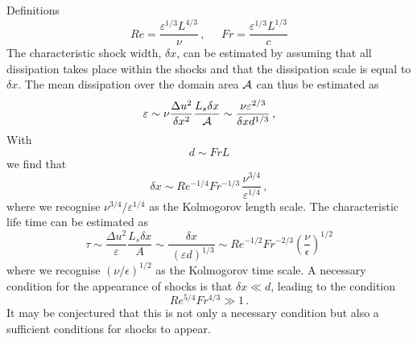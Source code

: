 \documentclass[12pt]{article}
\begin{document}
\vskip 5mm
\noindent Definitions
\begin{equation}
Re = \frac{\varepsilon^{1/3} L^{4/3}}{\nu} \, ,\;\;\;\;\; Fr = \frac{\varepsilon^{1/3} L^{1/3}}{c} 
\end{equation} 
The characteristic shock width, $ \delta x $, can be estimated by assuming that all dissipation takes place within the shocks and that the dissipation scale is equal to $ \delta x $. The mean dissipation over the domain area $ \cal{A} $
can thus be estimated as
\begin{equation}
\varepsilon \sim \nu  \frac{\Delta u^2} {\delta x^2} \frac{L_s \delta x} {\cal{A}}\sim \frac{\nu \varepsilon^{2/3} }{\delta x d^{1/3}} \, ,
\end{equation} 
With 
\begin{equation} \label{dScale}
d \sim Fr L   
\end{equation} 
we find that
\begin{equation}
\delta x \sim Re^{-1/4} Fr^{-1/3} \, \frac{\nu^{3/4}}{\varepsilon^{1/4}} \, ,
\end{equation}
where we recognise $ {\nu^{3/4}}/{\varepsilon^{1/4}} $ as the Kolmogorov length scale. The characteristic life time can be estimated as
\begin{equation}
\tau \sim  \frac{\Delta u^2}{\varepsilon} \frac{L_s \delta x}{A} \sim \frac{\delta x}{\; (\varepsilon d)^{1/3}} \sim Re^{-1/2} Fr^{-2/3} \left ( \frac {\nu}{\epsilon} \right )^{1/2} 
\end{equation} 
where we recognise  $ (  {\nu}/{\epsilon}  )^{1/2} $ as the Kolmogorov time scale. A necessary condition for the appearance of shocks is that $ \delta x \ll d $, leading to the condition
\begin{equation}
Re^{5/4} Fr^{4/3} \gg 1 \, .
\end{equation} 
It may be conjectured that this is not only a necessary condition but also a sufficient conditions for shocks to appear.
\end{document}
